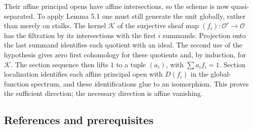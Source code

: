 \documentclass[11pt]{article}
\begin{document}
Their affine principal opens have affine intersections, so the scheme is
now quasi-separated. To apply Lemma 5.1 one must still generate the unit
globally, rather than merely on stalks. The kernel \(\mathcal K\) of the
surjective sheaf map \((f_i):\mathcal O^r\to\mathcal O\) has the
filtration by its intersections with the first \(i\) summands.
Projection onto the last summand identifies each quotient with an ideal.
The second use of the hypothesis gives zero first cohomology for these
quotients and, by induction, for \(\mathcal K\). The section sequence
then lifts \(1\) to a tuple \((a_i)\), with \(\sum a_i f_i=1\). Section
localization identifies each affine principal open with \(D(f_i)\) in
the global-function spectrum, and these identifications glue to an
isomorphism. This proves the sufficient direction; the necessary
direction is affine vanishing.

\subsection{References and
prerequisites}\label{references-and-prerequisites}
\end{document}

